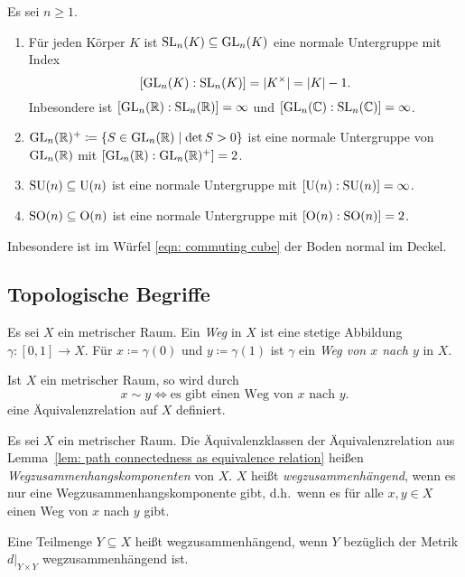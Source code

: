 \begin{proposition}
  Es sei $n \geq 1$.
  \begin{enumerate}[leftmargin=*, label=\roman*)]
    \item
      Für jeden Körper $K$ ist $\mathrm{SL}_n(K) \subseteq \mathrm{GL}_n(K)$ eine normale Untergruppe mit Index 
      \[
        [\mathrm{GL}_n(K) : \mathrm{SL}_n(K)] = |K^\times| = |K| - 1.
      \]
      Inbesondere ist $[\mathrm{GL}_n(\mathbb{R}) : \mathrm{SL}_n(\mathbb{R})] = \infty$ und $[\mathrm{GL}_n(\mathbb{C}) : \mathrm{SL}_n(\mathbb{C})] = \infty$.
    \item
      $\mathrm{GL}_n(\mathbb{R})^+ \coloneqq \{S \in \mathrm{GL}_n(\mathbb{R}) \mid \det S > 0\}$ ist eine normale Untergruppe von $\mathrm{GL}_n(\mathbb{R})$ mit $[\mathrm{GL}_n(\mathbb{R}) : \mathrm{GL}_n(\mathbb{R})^+] = 2$.
    \item
      $\mathrm{SU}(n) \subseteq \mathrm{U}(n)$ ist eine normale Untergruppe mit $[\mathrm{U}(n) : \mathrm{SU}(n)] = \infty$.
    \item
      $\mathrm{SO}(n) \subseteq \mathrm{O}(n)$ ist eine normale Untergruppe mit $[\mathrm{O}(n) : \mathrm{SO}(n)] = 2$.
  \end{enumerate}
  Inbesondere ist im Würfel \eqref{eqn: commuting cube} der Boden normal im Deckel.
\end{proposition}














\subsection{Topologische Begriffe}


\begin{definition}
  Es sei $X$ ein metrischer Raum.
  Ein \emph{Weg} in $X$ ist eine stetige Abbildung $\gamma \colon [0,1] \to X$.
  Für $x \coloneqq \gamma(0)$ und $y \coloneqq \gamma(1)$ ist $\gamma$ ein \emph{Weg von $x$ nach $y$} in $X$.
\end{definition}


\begin{lemma}\label{lem: path connectedness as equivalence relation}
  Ist $X$ ein metrischer Raum, so wird durch
  \[
    x \sim y
    \iff
    \text{es gibt einen Weg von $x$ nach $y$}.
  \]
  eine Äquivalenzrelation auf $X$ definiert.
\end{lemma}


\begin{definition}
  Es sei $X$ ein metrischer Raum.
  Die Äquivalenzklassen der Äquivalenzrelation aus Lemma~\ref{lem: path connectedness as equivalence relation} heißen \emph{Wegzusammenhangskomponenten} von $X$.
  $X$ heißt \emph{wegzusammenhängend}, wenn es nur eine Wegzusammenhangskomponente gibt, d.h.\ wenn es für alle $x, y \in X$ einen Weg von $x$ nach $y$ gibt.
  
  Eine Teilmenge $Y \subseteq X$ heißt wegzusammenhängend, wenn $Y$ bezüglich der Metrik $d|_{Y \times Y}$ wegzusammenhängend ist.
\end{definition}


